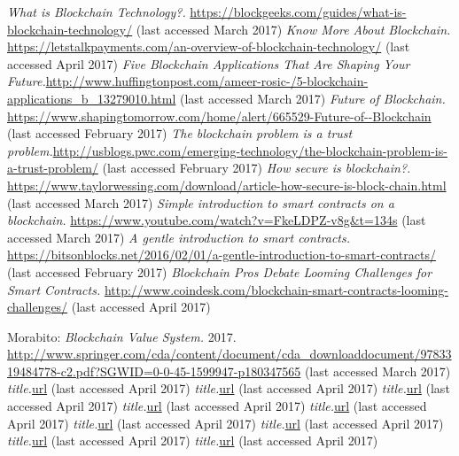 \begin{thebibliography}{99}
\emph{What is Blockchain Technology?.} \url{https://blockgeeks.com/guides/what-is-blockchain-technology/} (last accessed March 2017)
\emph{Know More About Blockchain.} \url{https://letstalkpayments.com/an-overview-of-blockchain-technology/} (last accessed April 2017)
\emph{Five Blockchain Applications That Are Shaping Your Future.}\url{http://www.huffingtonpost.com/ameer-rosic-/5-blockchain-applications_b_13279010.html} (last accessed March 2017)
\emph{Future of Blockchain.} \url{https://www.shapingtomorrow.com/home/alert/665529-Future-of--Blockchain} (last accessed February 2017)
\emph{The blockchain problem is a trust problem.}\url{http://usblogs.pwc.com/emerging-technology/the-blockchain-problem-is-a-trust-problem/} (last accessed February 2017)
\emph{How secure is blockchain?.} \url{https://www.taylorwessing.com/download/article-how-secure-is-block-chain.html} (last accessed March 2017)
\emph{Simple introduction to smart contracts on a blockchain.} \url{https://www.youtube.com/watch?v=FkeLDPZ-v8g&t=134s} (last accessed March 2017)
\emph{A gentle introduction to smart contracts.} \url{https://bitsonblocks.net/2016/02/01/a-gentle-introduction-to-smart-contracts/} (last accessed February 2017)
\emph{Blockchain Pros Debate Looming Challenges for Smart Contracts.} \url{http://www.coindesk.com/blockchain-smart-contracts-looming-challenges/} (last accessed April 2017)



Morabito: \emph{Blockchain Value System.} 2017. \url{http://www.springer.com/cda/content/document/cda_downloaddocument/9783319484778-c2.pdf?SGWID=0-0-45-1599947-p180347565} (last accessed March 2017)
\emph{title.}\url{url} (last accessed April 2017)
\emph{title.}\url{url} (last accessed April 2017)
\emph{title.}\url{url} (last accessed April 2017)
\emph{title.}\url{url} (last accessed April 2017)
\emph{title.}\url{url} (last accessed April 2017)
\emph{title.}\url{url} (last accessed April 2017)
\emph{title.}\url{url} (last accessed April 2017)
\emph{title.}\url{url} (last accessed April 2017)
\emph{title.}\url{url} (last accessed April 2017)









\end{thebibliography}
